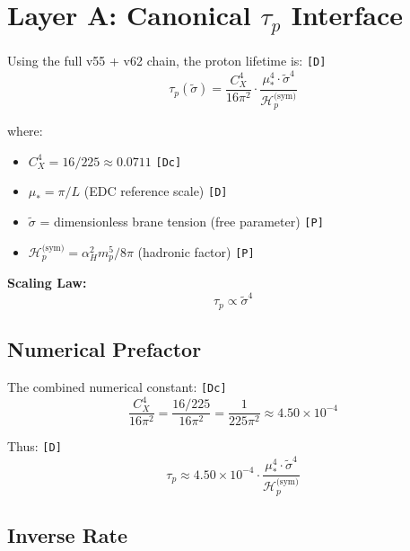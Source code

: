 \documentclass[11pt,a4paper]{article}
\newcommand{\tagD}{\textcolor{green!50!black}{\texttt{[D]}}}
\newcommand{\tagDc}{\textcolor{blue!70!black}{\texttt{[Dc]}}}
\newcommand{\tagP}{\textcolor{orange!80!black}{\texttt{[P]}}}
\theoremstyle{definition}
\begin{document}
\section{Layer A: Canonical $\tau_p$ Interface}
\label{sec:canonical-interface}

\begin{interfacebox}
Using the full v55 + v62 chain, the proton lifetime is: \tagD{}
\begin{equation}
\label{eq:canonical-interface}
\boxed{\tau_p(\tilde{\sigma}) = \frac{C_X^4}{16\pi^2} \cdot \frac{\mu_*^4 \cdot \tilde{\sigma}^4}{\mathcal{H}_p^{\text{(sym)}}}}
\end{equation}

where:
\begin{itemize}
  \item $C_X^4 = 16/225 \approx 0.0711$ \tagDc{}
  \item $\mu_* = \pi/L$ (EDC reference scale) \tagD{}
  \item $\tilde{\sigma}$ = dimensionless brane tension (free parameter) \tagP{}
  \item $\mathcal{H}_p^{\text{(sym)}} = \alpha_H^2 m_p^5 / 8\pi$ (hadronic factor) \tagP{}
\end{itemize}

\textbf{Scaling Law:}
\begin{equation}
\label{eq:canonical-scaling}
\boxed{\tau_p \propto \tilde{\sigma}^4}
\end{equation}
\end{interfacebox}

\subsection{Numerical Prefactor}
\label{subsec:numerical-prefactor}

The combined numerical constant: \tagDc{}
\begin{equation}
\label{eq:numerical-prefactor}
\frac{C_X^4}{16\pi^2} = \frac{16/225}{16\pi^2} = \frac{1}{225\pi^2} \approx 4.50 \times 10^{-4}
\end{equation}

Thus: \tagD{}
\begin{equation}
\label{eq:taup-numerical}
\tau_p \approx 4.50 \times 10^{-4} \cdot \frac{\mu_*^4 \cdot \tilde{\sigma}^4}{\mathcal{H}_p^{\text{(sym)}}}
\end{equation}

\subsection{Inverse Rate}
\label{subsec:inverse-rate}
\end{document}
